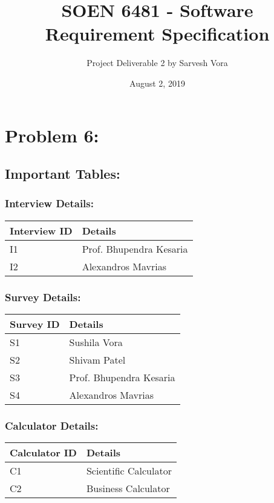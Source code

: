 \documentclass{article}
\title{SOEN 6481 - Software Requirement Specification}
\author{Project Deliverable 2 by Sarvesh Vora}
\date{August 2, 2019}
\begin{document}
\maketitle
{}
\newpage
\tableofcontents
\newpage
\section{Problem 6:}
\subsection{Important Tables:}
\subsubsection{Interview Details:}
\begin{table}[h!]
    \begin{tabular}{|| l|| l ||}
        \hline
         Interview ID & Details  \\
         \hline
         I1 & Prof. Bhupendra Kesaria \\
         \hline
         I2 & Alexandros Mavrias \\
         \hline
    \end{tabular}
\end{table}
\subsubsection{Survey Details:}
\begin{table}[h!]
    \begin{tabular}{|| l || l || }
        \hline
        Survey ID & Details \\
        \hline
        S1 & Sushila Vora \\ 
        \hline
        S2 & Shivam Patel \\ 
        \hline
        S3 & Prof. Bhupendra Kesaria \\ 
        \hline
        S4 & Alexandros Mavrias \\ 
        \hline
    \end{tabular}
\end{table}
\subsubsection{Calculator Details:}
\begin{table}[h!]
    \begin{tabular}{|| l || l || }
        \hline
        Calculator ID & Details \\
        \hline
        C1 & Scientific Calculator \\ 
        \hline
        C2 & Business Calculator \\ 
        \hline
    \end{tabular}
\end{table}
\end{document}
